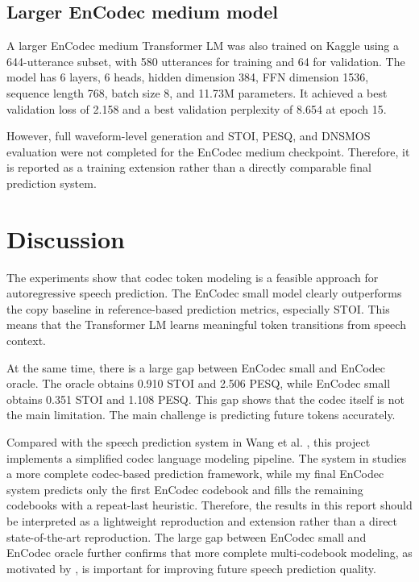 \documentclass{article}
\begin{document}
	\subsection{Larger EnCodec medium model}
	
	A larger EnCodec medium Transformer LM was also trained on Kaggle using a 644-utterance subset, with 580 utterances for training and 64 for validation. The model has 6 layers, 6 heads, hidden dimension 384, FFN dimension 1536, sequence length 768, batch size 8, and 11.73M parameters. It achieved a best validation loss of 2.158 and a best validation perplexity of 8.654 at epoch 15.
	
	However, full waveform-level generation and STOI, PESQ, and DNSMOS evaluation were not completed for the EnCodec medium checkpoint. Therefore, it is reported as a training extension rather than a directly comparable final prediction system.
	
	\section{Discussion}
	\label{sec:discussion}
	
	The experiments show that codec token modeling is a feasible approach for autoregressive speech prediction. The EnCodec small model clearly outperforms the copy baseline in reference-based prediction metrics, especially STOI. This means that the Transformer LM learns meaningful token transitions from speech context.
	
	At the same time, there is a large gap between EnCodec small and EnCodec oracle. The oracle obtains 0.910 STOI and 2.506 PESQ, while EnCodec small obtains 0.351 STOI and 1.108 PESQ. This gap shows that the codec itself is not the main limitation. The main challenge is predicting future tokens accurately.
	
	Compared with the speech prediction system in Wang et al. \cite{wang2026speech}, this project implements a simplified codec language modeling pipeline. The system in \cite{wang2026speech} studies a more complete codec-based prediction framework, while my final EnCodec system predicts only the first EnCodec codebook and fills the remaining codebooks with a repeat-last heuristic. Therefore, the results in this report should be interpreted as a lightweight reproduction and extension rather than a direct state-of-the-art reproduction. The large gap between EnCodec small and EnCodec oracle further confirms that more complete multi-codebook modeling, as motivated by \cite{wang2026speech}, is important for improving future speech prediction quality.
	
\end{document}
